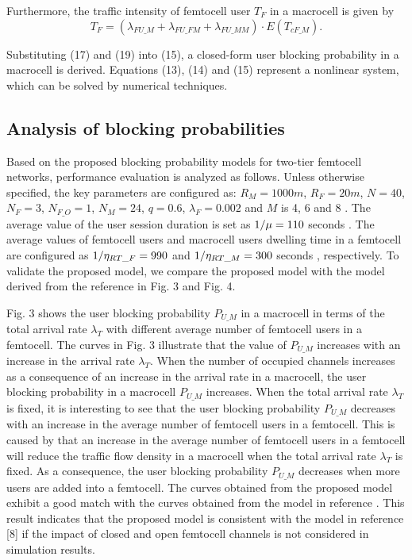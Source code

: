 \documentclass[10pt,final,journal,letterpaper,twoside,twocolumn]{IEEEtran}
\begin{document}
Furthermore, the traffic intensity of femtocell user ${T_F}$ in a macrocell is given by
\begin{equation}
{T_F} = \left( {{\lambda _{FU\_M}} + {\lambda _{FU\_FM}} + {\lambda _{FU\_MM}}} \right) \cdot E\left( {T_{cF\_M}} \right).
\label{eq26}
\tag{19}
\end{equation}

Substituting (17) and (19) into (15), a closed-form user blocking probability in a
macrocell is derived. Equations (13), (14) and (15) represent a nonlinear
system, which can be solved by numerical techniques.

\subsection{Analysis of blocking probabilities}

Based on the proposed blocking probability models for two-tier femtocell
networks, performance evaluation is analyzed as follows. Unless otherwise specified, the key
parameters are configured as: ${R_M} = 1000m$, ${R_F} = 20m$, $N = 40$, ${N_F} = 3$, ${N_{F\_O}} = 1$, ${N_M} = 24$,  $q = 0.6$, ${\lambda _F} =
0.002$ and $M$ is 4, 6 and 8 \cite{Mansfield08,ABI07}. The average value of the user session duration is set
as ${1 \mathord{\left/ {\vphantom {1 \mu }} \right.
\kern-\nulldelimiterspace} \mu } = 110$ seconds \cite{3g}. The average values of femtocell users and macrocell users dwelling time in a femtocell are configured as ${1 \mathord{\left/
{\vphantom {1 {{\eta _{RT\_F}}}}} \right. \kern-\nulldelimiterspace} {{\eta
_{RT\_F}}}} = 990$ and ${1 \mathord{\left/ {\vphantom {1 {{\eta _{RT\_M}}}}}
\right. \kern-\nulldelimiterspace} {{\eta _{RT\_M}}}} = 300$ seconds \cite{Zhang10,Xiang10},
respectively. To validate the proposed model, we compare the proposed model with the model derived from the reference \cite{Zhang10} in Fig. 3 and Fig. 4.


Fig. 3 shows the user blocking probability ${P_{U\_M}}$ in a macrocell in terms of the total
arrival rate ${\lambda _T}$ with different average number of femtocell users in a
femtocell. The curves in Fig. 3 illustrate that the value of ${P_{U\_M}}$
increases with an increase in the arrival rate ${\lambda _T}$. When the number of
occupied channels increases as a consequence of an increase in the arrival rate in a macrocell, the user
blocking probability in a macrocell ${P_{U\_M}}$ increases. When the total arrival
rate ${\lambda _T}$ is fixed, it is interesting to see that the user blocking probability ${P_{U\_M}}$ decreases
with an increase in the average number of femtocell users in a femtocell. This is caused by that an increase in the average number of femtocell users in a femtocell will
reduce the traffic flow density in a macrocell when the total arrival rate ${\lambda
_T}$ is fixed. As a consequence, the user blocking
probability ${P_{U\_M}}$ decreases when more users are added into a
femtocell. The curves obtained from the proposed model exhibit a good match with the curves obtained from the model in reference \cite{Zhang10}. This result indicates that the proposed model is consistent with the model in reference [8] if the impact of closed and open femtocell channels is not considered in simulation results.
\end{document}
